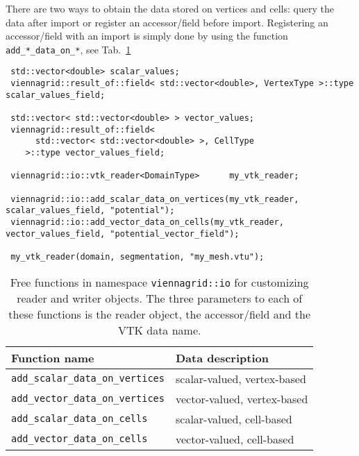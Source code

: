 
There are two ways to obtain the data stored on vertices and cells: query the data after import or register an accessor/field before import.
Registering an accessor/field with an import is simply done by using the function \lstinline|add_*_data_on_*|, see Tab.~\ref{tab:customizing-io}

 \begin{lstlisting}
 std::vector<double> scalar_values;
 viennagrid::result_of::field< std::vector<double>, VertexType >::type scalar_values_field;
 
 std::vector< std::vector<double> > vector_values;
 viennagrid::result_of::field<
      std::vector< std::vector<double> >, CellType
    >::type vector_values_field;
 
 viennagrid::io::vtk_reader<DomainType>      my_vtk_reader;
 
 viennagrid::io::add_scalar_data_on_vertices(my_vtk_reader, scalar_values_field, "potential");
 viennagrid::io::add_vector_data_on_cells(my_vtk_reader, vector_values_field, "potential_vector_field");
 
 my_vtk_reader(domain, segmentation, "my_mesh.vtu");
 \end{lstlisting}
 
 

 \begin{table}[tb]
 \begin{center}
  \begin{tabular}{|l|l|}
   \hline
   Function name & Data description \\
   \hline
   \lstinline|add_scalar_data_on_vertices| & scalar-valued, vertex-based \\
   \lstinline|add_vector_data_on_vertices| & vector-valued, vertex-based \\
   \hline
   \lstinline|add_scalar_data_on_cells| & scalar-valued, cell-based \\
   \lstinline|add_vector_data_on_cells| & vector-valued, cell-based \\
   \hline
  \end{tabular}
 \end{center}
 \caption{Free functions in namespace \lstinline|viennagrid::io| for customizing reader and writer objects. The three parameters to each of these functions is the reader object, the accessor/field and the VTK data name.}
 \label{tab:customizing-io}
 \end{table}
 
